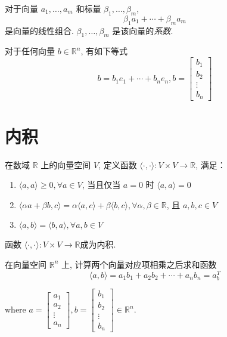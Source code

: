 \begin{definition}[线性组合]
    对于向量 \( a_{1}, \ldots, a_{m} \) 和标量 \( \beta_{1}, \ldots, \beta_{m} \),
    $$ \beta_{1} a_{1}+\cdots+\beta_{m} a_{m} $$
    是向量的线性组合. \( \beta_{1}, \ldots, \beta_{m} \) 是该向量的\textit{系数}. 
\end{definition}

\begin{example}
    对于任何向量 \( b \in \mathbb{R}^{n} \), 有如下等式
    $$ b=b_{1} e_{1}+\cdots+b_{n} e_{n}, b=\left[\begin{array}{c}b_{1} \\ b_{2} \\ \vdots \\ b_{n}\end{array}\right] $$
\end{example}

\section{内积}

\begin{definition}[内积]
    在数域 \( \mathbb{R} \) 上的向量空间 \( V \), 定义函数 \( \langle\cdot,\cdot\rangle:V \times V \rightarrow \mathbb{R} \), 满足：

    \begin{enumerate}
        \item $ \langle{a}, {a}\rangle \geq 0, \forall {a} \in V $, 当且仅当 $a=0$ 时 $ \langle a, a\rangle=0 $
        \item \( \langle\alpha {a}+\beta {b}, c\rangle=\alpha\langle{a}, c\rangle+\beta\langle{b}, c\rangle, \forall \alpha, \beta \in \mathbb{R} \), 且 \( {a}, {b}, c \in V \)
        \item \( \langle{a}, {b}\rangle=\langle{b}, {a}\rangle, \forall {a}, {b} \in V \)
    \end{enumerate}

    函数 \( \langle\cdot,\cdot\rangle:V \times V \rightarrow \mathbb{R} \)成为内积. 
\end{definition}

\begin{example}
    在向量空间 \( \mathbb{R}^{n} \) 上,  计算两个向量对应项相乘之后求和函数
    \[ \langle a, b\rangle=a_{1} b_{1}+a_{2} b_{2}+\cdots+a_{n} b_{n}=a^{T}_{b} \]

where \( a=\left[\begin{array}{c}a_{1} \\ a_{2} \\ \vdots \\ a_{n}\end{array}\right], b=\left[\begin{array}{c}b_{1} \\ b_{2} \\ \vdots \\ b_{n}\end{array}\right] \in \mathbb{R}^{n} \).
\end{example}


